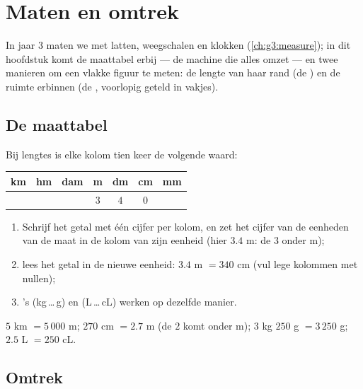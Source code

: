\chapter{Maten en omtrek}\label{ch:g4:measure}

In jaar 3 maten we met latten, weegschalen en klokken
(\cref{ch:g3:measure}); in dit hoofdstuk komt de maattabel erbij --- de
machine die alles omzet --- en twee manieren om een vlakke figuur te meten:
de lengte van haar rand (de ) en de ruimte erbinnen (de ,
voorlopig geteld in vakjes).

\section{De maattabel}

\begin{method}\label{met:g4:measure:table}
Bij lengtes is elke kolom tien keer de volgende waard:
\begin{center}
\renewcommand{\arraystretch}{1.3}
\begin{tabular}{c|c|c|c|c|c|c}
km & hm & dam & m & dm & cm & mm \\
\hline
 & & & $3$ & $4$ & $0$ & \\
\end{tabular}
\end{center}
\begin{enumerate}
  \item Schrijf het getal met één cijfer per kolom, en zet het cijfer van
        de eenheden van de maat in de kolom van zijn eenheid (hier $3.4$ m:
        de $3$ onder m);
  \item lees het getal in de nieuwe eenheid: $3.4$ m $= 340$ cm (vul lege
        kolommen met nullen);
  \item {}'s (kg\,\dots\,g) en  (L\,\dots\,cL) werken op dezelfde
        manier.
\end{enumerate}
\end{method}

\begin{example}\label{ex:g4:measure:convert}
$5$ km $= 5\,000$ m; \quad $270$ cm $= 2.7$ m (de $2$ komt onder m);
\quad $3$ kg $250$ g $= 3\,250$ g; \quad $2.5$ L $= 250$ cL.
\end{example}

\section{Omtrek}

